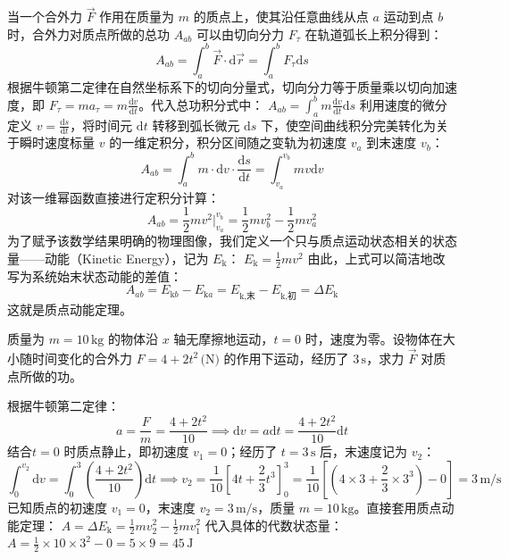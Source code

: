 \documentclass[lang=cn,11pt]{elegantbook}
\begin{document}
\begin{theorem}[质点动能定理]
当一个合外力 $\vec{F}$ 作用在质量为 $m$ 的质点上，使其沿任意曲线从点 $a$ 运动到点 $b$ 时，合外力对质点所做的总功 $A_{ab}$ 可以由切向分力 $F_\tau$ 在轨道弧长上积分得到：$$A_{ab} = \int_{a}^{b} \vec{F} \cdot \mathrm{d}\vec{r} = \int_{a}^{b} F_\tau \mathrm{d}s$$根据牛顿第二定律在自然坐标系下的切向分量式，切向分力等于质量乘以切向加速度，即 $F_\tau = ma_\tau = m\frac{\mathrm{d}v}{\mathrm{d}t}$。代入总功积分式中： \(A_{ab} = \int_{a}^{b} m\frac{\mathrm{d}v}{\mathrm{d}t} \mathrm{d}s\) 利用速度的微分定义 $v = \frac{\mathrm{d}s}{\mathrm{d}t}$，将时间元 $\mathrm{d}t$ 转移到弧长微元 $\mathrm{d}s$ 下，使空间曲线积分完美转化为关于瞬时速度标量 $v$ 的一维定积分，积分区间随之变轨为初速度 $v_a$ 到末速度 $v_b$：$$A_{ab} = \int_{a}^{b} m \cdot \mathrm{d}v \cdot \frac{\mathrm{d}s}{\mathrm{d}t} = \int_{v_a}^{v_b} mv \mathrm{d}v$$对该一维幂函数直接进行定积分计算：$$A_{ab} = \frac{1}{2}mv^2 \Big|_{v_a}^{v_b} = \frac{1}{2}mv_b^2 - \frac{1}{2}mv_a^2$$为了赋予该数学结果明确的物理图像，我们定义一个只与质点运动状态相关的状态量——动能（Kinetic Energy），记为 $E_{\text{k}}$： \(E_{\text{k}} = \frac{1}{2}mv^2\) 由此，上式可以简洁地改写为系统始末状态动能的差值：$$A_{ab} = E_{\text{k}b} - E_{\text{k}a} = E_{\text{k,末}} - E_{\text{k,初}} = \Delta E_{\text{k}}$$这就是质点动能定理。
\end{theorem}

\begin{exercise}
质量为 $m = 10\,\text{kg}$ 的物体沿 $x$ 轴无摩擦地运动，$t = 0$ 时，速度为零。设物体在大小随时间变化的合外力 $F = 4 + 2t^2\,\text{(N)}$ 的作用下运动，经历了 $3\,\text{s}$，求力 $\vec{F}$ 对质点所做的功。
\end{exercise}
\begin{solution}
根据牛顿第二定律：$$a = \frac{F}{m} = \frac{4 + 2t^2}{10}\implies\mathrm{d}v = a\mathrm{d}t = \frac{4 + 2t^2}{10}\mathrm{d}t$$结合$t = 0$ 时质点静止，即初速度 $v_1 = 0$；经历了 $t = 3\,\text{s}$ 后，末速度记为 $v_2$：
$$\int_{0}^{v_2} \mathrm{d}v = \int_{0}^{3} \left( \frac{4 + 2t^2}{10} \right) \mathrm{d}t\implies v_2 = \frac{1}{10} \left[ 4t + \frac{2}{3}t^3 \right]_0^3= \frac{1}{10} \left[ \left(4 \times 3 + \frac{2}{3} \times 3^3\right) - 0 \right] = 3\,\text{m/s}$$
已知质点的初速度 $v_1 = 0$，末速度 $v_2 = 3\,\text{m/s}$，质量 $m = 10\,\text{kg}$。直接套用质点动能定理： \(A = \Delta E_{\text{k}} = \frac{1}{2}mv_2^2 - \frac{1}{2}mv_1^2\) 代入具体的代数状态量： \(A = \frac{1}{2} \times 10 \times 3^2 - 0 = 5 \times 9 = 45\,\text{J}\) 
\end{solution}
\end{document}
